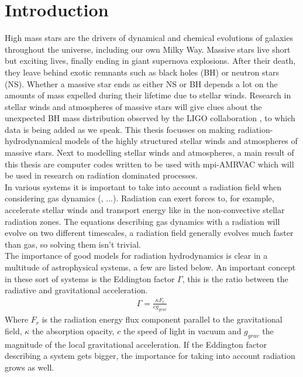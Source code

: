 \chapter{Introduction}
High mass stars are the drivers of dynamical and chemical evolutions of galaxies throughout the universe, including our own Milky Way. Massive stars live short but exciting lives, finally ending in giant supernova explosions. After their death, they leave behind exotic remnants such as black holes (BH) or neutron stars (NS). Whether a massive star ends as either NS or BH depends a lot on the amounts of mass expelled during their lifetime due to stellar winds. Research in stellar winds and atmospheres of massive stars will give clues about the unexpected BH mass distribution observed by the LIGO collaboration \cite{Abbott1}, to which data is being added as we speak. This thesis focusses on making radiation-hydrodynamical models of the highly structured stellar winds and atmospheres of massive stars. Next to modelling stellar winds and atmospheres, a main result of this thesis are computer codes written to be used with mpi-AMRVAC which will be used in research on radiation dominated processes.\\

In various systems it is important to take into account a radiation field when considering gas dynamics (\cite{Tetsu2016},  ...). Radiation can exert forces to, for example, accelerate stellar winds and transport energy like in the non-convective stellar radiation zones. The equations describing gas dynamics with a radiation will evolve on two different timescales, a radiation field generally evolves much faster than gas, so solving them isn't trivial. \\

The importance of good models for radiation hydrodynamics is clear in a multitude of astrophysical systems, a few are listed below. An important concept in these sort of systems is the Eddington factor $\Gamma$, this is the ratio between the radiative and gravitational acceleration.
\begin{align}
	\Gamma = \frac{\kappa F_r}{c g_{grav}}
\end{align}
Where $F_r$ is the radiation energy flux component parallel to the gravitational field, $\kappa$ the absorption opacity, $c$ the speed of light in vacuum and $g_{grav}$ the magnitude of the local gravitational acceleration. If the Eddington factor describing a system gets bigger, the importance for taking into account radiation grows as well.

